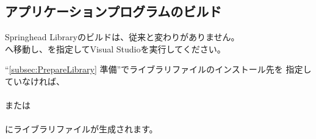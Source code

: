 \subsection{アプリケーションプログラムのビルド}
\label{subsec:BuildApplication}

\noindent
Springhead Libraryのビルドは、従来と変わりがありません。\\
\build へ移動し、を指定してVisual Studioを実行してください。

\medskip
``\ref{subsec:PrepareLibrary} 準備''でライブラリファイルのインストール先を
指定していなければ、\\
\hspace{20pt}\\
または\\
\hspace{20pt}\\
にライブラリファイルが生成されます。

